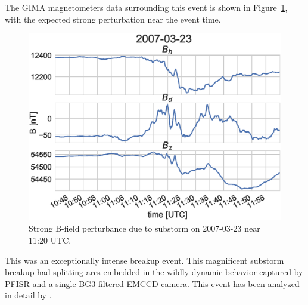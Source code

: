 The GIMA magnetometers data surrounding this event is shown in Figure~\ref{fig:20070323mag}, with the expected strong perturbation near the event time.
\begin{figure}
    \includegraphics[width=\columnwidth]{gfx/2007-03-23/mag}
    \caption{Strong B-field perturbance due to substorm on 2007-03-23 near 11:20 UTC.}
    \label{fig:20070323mag}
\end{figure}

This was an exceptionally intense breakup event.
This magnificent substorm breakup had splitting arcs embedded in the wildly dynamic behavior captured by PFISR and a single BG3-filtered EMCCD camera. 
This event has been analyzed in detail by \citet{semeter2008,akbari2012}.
